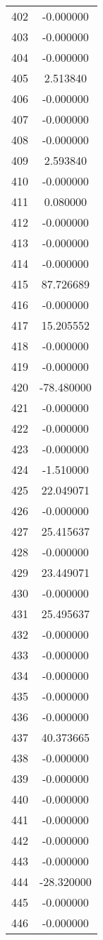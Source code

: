 \documentclass[12pt]{article}
\begin{document}
\begin{longtable}{@{}cc@{}}
402 & -0.000000 \\
403 & -0.000000 \\
404 & -0.000000 \\
405 & 2.513840 \\
406 & -0.000000 \\
407 & -0.000000 \\
408 & -0.000000 \\
409 & 2.593840 \\
410 & -0.000000 \\
411 & 0.080000 \\
412 & -0.000000 \\
413 & -0.000000 \\
414 & -0.000000 \\
415 & 87.726689 \\
416 & -0.000000 \\
417 & 15.205552 \\
418 & -0.000000 \\
419 & -0.000000 \\
420 & -78.480000 \\
421 & -0.000000 \\
422 & -0.000000 \\
423 & -0.000000 \\
424 & -1.510000 \\
425 & 22.049071 \\
426 & -0.000000 \\
427 & 25.415637 \\
428 & -0.000000 \\
429 & 23.449071 \\
430 & -0.000000 \\
431 & 25.495637 \\
432 & -0.000000 \\
433 & -0.000000 \\
434 & -0.000000 \\
435 & -0.000000 \\
436 & -0.000000 \\
437 & 40.373665 \\
438 & -0.000000 \\
439 & -0.000000 \\
440 & -0.000000 \\
441 & -0.000000 \\
442 & -0.000000 \\
443 & -0.000000 \\
444 & -28.320000 \\
445 & -0.000000 \\
446 & -0.000000 \\

\end{longtable}
\end{document}
